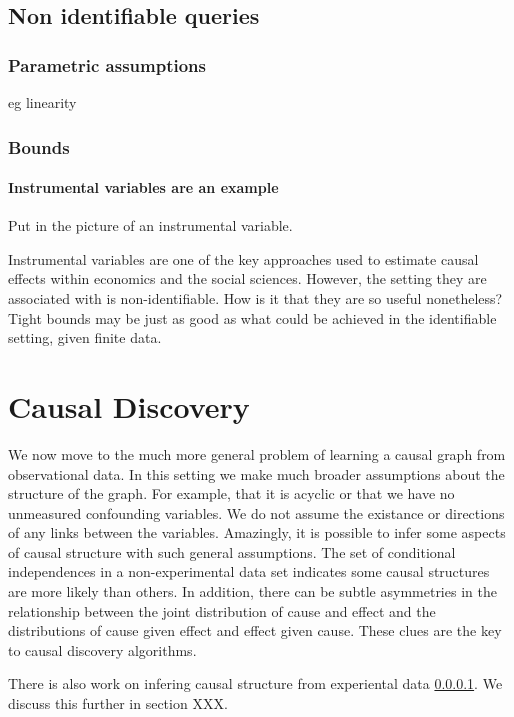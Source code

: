 \documentclass[11pt,a4paper,oneside]{book}
\begin{document}
\subsection*{Non identifiable queries}

\subsubsection*{Parametric assumptions}
eg linearity

\subsubsection*{Bounds}
\paragraph{Instrumental variables are an example}

Put in the picture of an instrumental variable.

Instrumental variables are one of the key approaches used to estimate causal effects within economics and the social sciences. However, the setting they are associated with is non-identifiable. How is it that they are so useful nonetheless? Tight bounds may be just as good as what could be achieved in the identifiable setting, given finite data. 

\section*{Causal Discovery}
We now move to the much more general problem of learning a causal graph from observational data. In this setting we make much broader assumptions about the structure of the graph. For example, that it is acyclic or that we have no unmeasured confounding variables. We do not assume the existance or directions of any links between the variables. Amazingly, it is possible to infer some aspects of causal structure with such general assumptions. The set of conditional independences in a non-experimental data set indicates some causal structures are more likely than others. In addition, there can be subtle asymmetries in the relationship between the joint distribution of cause and effect and the distributions of cause given effect and effect given cause. These clues are the key to causal discovery algorithms.

There is also work on infering causal structure from experiental data \ref{}. We discuss this further in section XXX.
\end{document}
